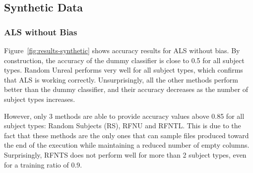 \documentclass[10pt, conference, compsocconf]{IEEEtran}
\newcommand{\todo}[1]{\marginpar{\parbox{18mm}{\flushleft\tiny\color{red}\textbf{TODO}:
      #1}}}
\begin{document}

\subsection{Synthetic Data}

\subsubsection{ALS without Bias}
 Figure~\ref{fig:results-synthetic} shows accuracy results for ALS 
 without bias. By construction, the accuracy of the dummy classifier is 
 close to 0.5 for all subject types. Random Unreal performs very well 
 for all subject types, which confirms that ALS is working correctly. 
 Unsurprisingly, all the other methods 
perform better than the dummy classifier, and their accuracy decreases 
as the number of subject types increases.

However, only 3 methods are able to provide accuracy values above 0.85 
for all subject types: Random Subjects (RS), RFNU and RFNTL. This is 
due to the fact that these methods are the only ones that can sample 
files produced toward the end of the execution while maintaining a 
reduced number of empty columns. Surprisingly, RFNTS does not perform 
well for more than 2 subject types, even for a training ratio of 0.9.
\end{document}
